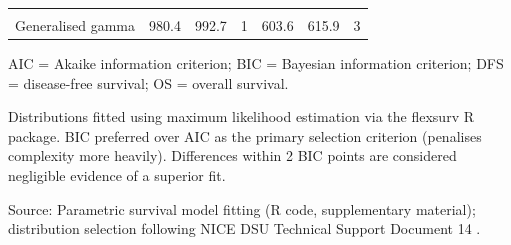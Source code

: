 \begin{table}[H]
{\begin{threeparttable}
\begin{tabular}[t]{lrrrrrr}
\cellcolor[HTML]{F7F9FC}{\textcolor[HTML]{2D3748}{Gompertz}} & \cellcolor[HTML]{F7F9FC}{\textcolor[HTML]{2D3748}{993.5}} & \cellcolor[HTML]{F7F9FC}{\textcolor[HTML]{2D3748}{1,001.7}} & \cellcolor[HTML]{F7F9FC}{\textcolor[HTML]{2D3748}{3}} & \cellcolor[HTML]{F7F9FC}{\textcolor[HTML]{2D3748}{614.8}} & \cellcolor[HTML]{F7F9FC}{\textcolor[HTML]{2D3748}{623.0}} & \cellcolor[HTML]{F7F9FC}{\textcolor[HTML]{2D3748}{5}}\\
\textcolor[HTML]{2D3748}{Generalised gamma} & \textcolor[HTML]{2D3748}{980.4} & \textcolor[HTML]{2D3748}{992.7} & \textcolor[HTML]{2D3748}{1} & \textcolor[HTML]{2D3748}{603.6} & \textcolor[HTML]{2D3748}{615.9} & \textcolor[HTML]{2D3748}{3}\\
\bottomrule
\end{tabular}
\begin{tablenotes}
\item AIC = Akaike information criterion; BIC = Bayesian information criterion; DFS = disease-free survival; OS = overall survival.
\item Distributions fitted using maximum likelihood estimation via the flexsurv R package. BIC preferred over AIC as the primary selection criterion (penalises complexity more heavily). Differences within 2 BIC points are considered negligible evidence of a superior fit.
\item Source: Parametric survival model fitting (R code, supplementary material); distribution selection following NICE DSU Technical Support Document 14 \parencite{latimer2013}.
\end{tablenotes}
\end{threeparttable}
}
\end{table}
